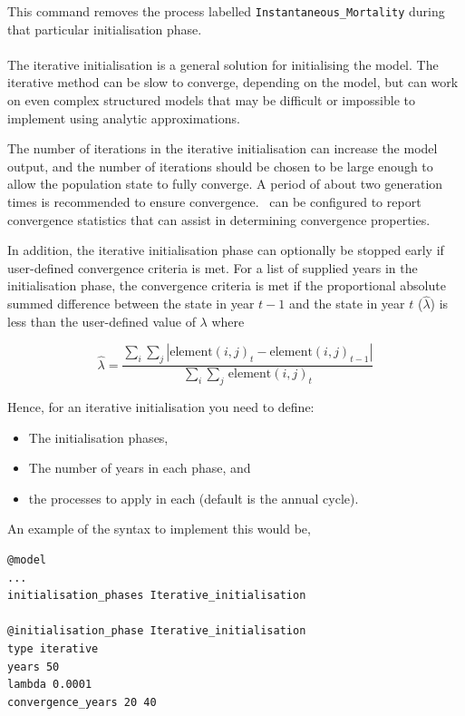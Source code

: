 This command removes the process labelled \texttt{Instantaneous\_Mortality} during that particular initialisation phase.

\paragraph{}

The iterative initialisation is a general solution for initialising the model. The iterative method can be slow to converge, depending on the model, but can work on even complex structured models that may be difficult or impossible to implement using analytic approximations.

The number of iterations in the iterative initialisation can increase the model output, and the number of iterations should be chosen to be large enough to allow the population state to fully converge. A period of about two generation times is recommended to ensure convergence. \CNAME\ can be configured to report convergence statistics that can assist in determining convergence properties.

In addition, the iterative initialisation phase can optionally be stopped early if user-defined convergence criteria is met. For a list of supplied years in the initialisation phase, the convergence criteria is met if the proportional absolute summed difference between the state in year $t-1$ and the state in year $t$ ($\widehat{\lambda}$) is less than the user-defined value of $\lambda$ where

\begin{equation}
  \widehat{\lambda} = \frac{\sum\limits_{i} \sum\limits_{j} \left|\text{element}(i,j)_t - \text{element}(i,j)_{t-1} \right|}{\sum\limits_{i} \sum\limits_{j} \frac{}{}\text{element}(i,j)_t}
\end{equation}

Hence, for an iterative initialisation you need to define:
\begin{itemize}
  \item The initialisation phases,
  \item The number of years in each phase, and
  \item the processes to apply in each (default is the annual cycle).
\end{itemize}

An example of the syntax to implement this would be,
{\small{\begin{verbatim}
@model
...
initialisation_phases Iterative_initialisation

@initialisation_phase Iterative_initialisation
type iterative
years 50
lambda 0.0001
convergence_years 20 40
\end{verbatim}}}

